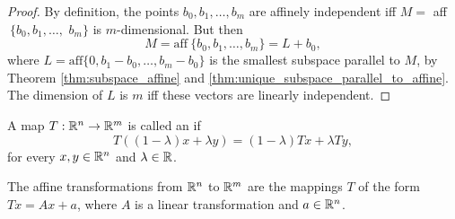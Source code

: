 \documentclass[11pt,a4paper]{article}
\begin{document}
\begin{proof}
    By definition, the points $b_0,b_1,\ldots, b_m$ are affinely independent iff $M = $ aff$\ \{b_0,b_1,\ldots,$ $b_m\}$ is $m$-dimensional. But then
    \begin{equation*}
        M = \mathrm{aff}\ \{b_0,b_1,\ldots, b_m\} = L + b_0, 
    \end{equation*}
    where $L = \mathrm{aff}\{0,b_1-b_0,\ldots, b_m-b_0\}$ is the smallest subspace parallel to $M$, by Theorem \ref{thm:subspace_affine} and \ref{thm:unique_subspace_parallel_to_affine}. The dimension of $L$ is $m$ iff these vectors are linearly independent. 
\end{proof}


\begin{definition}
    A map $T:\mathbb{R}^n\rightarrow \mathbb{R}^m$ is called an  if
    \begin{equation*}
        T((1-\lambda)x + \lambda y) = (1-\lambda) Tx + \lambda Ty,
    \end{equation*}
    for every $x,y\in\mathbb{R}^n$ and $\lambda\in\mathbb{R}$.
\end{definition}

\begin{theorem}\label{thm:affine_linear_relationship}
    The affine transformations from $\mathbb{R}^n$ to $\mathbb{R}^m$ are the mappings $T$ of the form $Tx = Ax+a$, where $A$ is a linear transformation and $a\in \mathbb{R}^n$.
\end{theorem}
\end{document}
